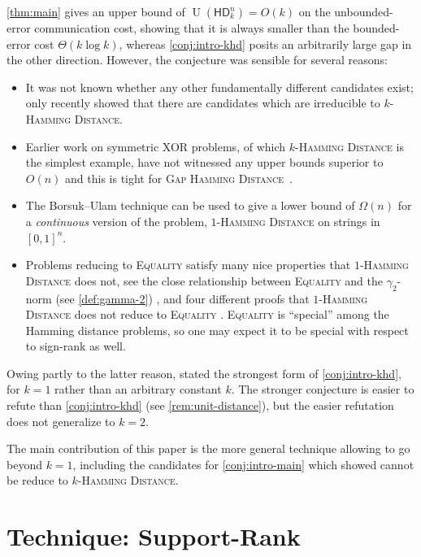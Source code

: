 \documentclass[conference]{IEEEtran}
\DeclareMathOperator{\U}{U}
\newcommand{\HD}[1]{\mathsf{HD}_{#1}}
\begin{document}
\cref{thm:main} 
gives an upper bound of $\U(\HD{k}^n) = O(k)$ on the unbounded-error
communication cost, showing that it is always smaller than the bounded-error
cost $\Theta(k \log k)$, whereas \cref{conj:intro-khd} posits an arbitrarily
large gap in the other direction. However, the conjecture was sensible for
several reasons:
\begin{itemize}[itemsep=0pt]
  \item It was not known whether any other fundamentally different candidates exist; \cite{FGHH25} only recently showed that there are candidates which are irreducible to \textsc{$k$-Hamming Distance}.
  \item Earlier work on symmetric XOR problems, of which
\textsc{$k$-Hamming Distance} is the simplest example, have not witnessed any upper bounds
superior to $O(n)$ \cite{HQ17} and this is tight for \textsc{Gap Hamming Distance}~\cite{HHM23}.
  \item The Borsuk--Ulam technique can be used to give a lower bound of $\Omega(n)$ for a \emph{continuous} version of the problem, \textsc{$1$-Hamming Distance} on strings in $[0,1]^n$.
  \item Problems reducing to \textsc{Equality} 
  satisfy many nice properties that \textsc{$1$-Hamming Distance} does not, see \eg
  the close relationship between \textsc{Equality} and the $\gamma_2$-norm (see
  \cref{def:gamma-2}) \cite{HHH22,CHHS23,PSS23,CHZZ24,CHHNPS25,Tom25}, and four different
  proofs that \textsc{$1$-Hamming Distance} does not reduce to \textsc{Equality}
  \cite{HHH22,HWZ22,FHHH24,HR24}. \textsc{Equality} is
  ``special'' among the Hamming distance problems, so one may expect it to be
  special with respect to sign-rank as well.
\end{itemize}
Owing partly to the latter reason, \cite{HHPTZ22,HHM23,HZ24} stated the strongest form of
\cref{conj:intro-khd}, for $k=1$ rather than an arbitrary constant $k$. The stronger conjecture is
easier to refute than \cref{conj:intro-khd} (see \cref{rem:unit-distance}), but the easier
refutation does not generalize to $k=2$.

The main contribution of this paper is the more general technique allowing to go
beyond $k=1$, including the candidates for \cref{conj:intro-main} which
\cite{FGHH25} showed cannot be reduce to \textsc{$k$-Hamming Distance}. 

\section{Technique: Support-Rank}
\label{sec:techniques}
\end{document}
